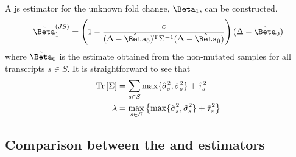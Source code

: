 A \gls{js} estimator for the unknown fold change, $\Beta_1$, can be constructed.
%
\begin{equation}
  \hat{\Beta}_1^{(JS)} = \left( 1 - \frac{c}{(\Delta - \hat{\Beta}_0)^\tran \Sigma^{-1} (\Delta - \hat{\Beta}_0)} \right)(\Delta - \hat{\Beta}_0)
  \label{eqn:js_defn}
\end{equation}
%
where $\hat{\Beta}_0$ is the estimate obtained from the non-mutated samples for all transcripts $s \in S$.
It is straightforward to see that
%
\begin{align*}
  \mathrm{Tr} \left[ \Sigma \right] & = \sum_{s \in S} \max\{ \hat{\sigma}_s^2, \tilde{\sigma}_s^2 \} + \hat{\tau}_s^2                  \\
  \lambda        & = \max_{s \in S} \left\{ \max\{ \hat{\sigma}_s^2, \tilde{\sigma}_s^2 \} + \hat{\tau}_s^2 \right\}
\end{align*}

\subsection{Comparison between the  and  estimators}

